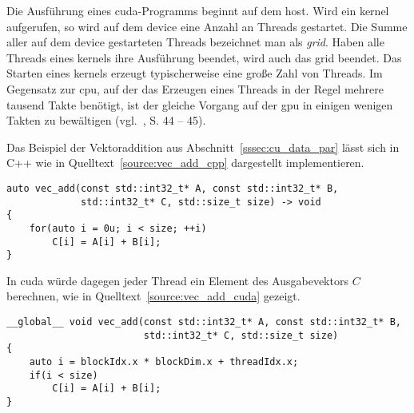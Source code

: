 Die Ausführung eines \gls{cuda}-Programms beginnt auf dem \gls{host}. Wird ein \gls{kernel} aufgerufen, so wird auf dem
\gls{device} eine Anzahl an Threads gestartet. Die Summe aller auf dem \gls{device} gestarteten Threads bezeichnet
man als \textit{\gls{grid}}. Haben alle Threads eines \gls{kernel}s ihre Ausführung beendet, wird auch das \gls{grid}
beendet.
Das Starten eines \gls{kernel}s erzeugt typischerweise eine große Zahl von Threads. Im Gegensatz zur \gls{cpu}, auf der
das Erzeugen eines Threads in der Regel mehrere tausend Takte benötigt, ist der gleiche Vorgang auf der \gls{gpu} in
einigen wenigen Takten zu bewältigen (vgl.~\cite{kirkhwu}, S. 44 -- 45).

Das Beispiel der Vektoraddition aus Abschnitt~\ref{sssec:cu_data_par} lässt sich in C++ wie in
Quelltext~\ref{source:vec_add_cpp} dargestellt implementieren. 

\begin{code}
\begin{verbatim}
auto vec_add(const std::int32_t* A, const std::int32_t* B,
             std::int32_t* C, std::size_t size) -> void
{
    for(auto i = 0u; i < size; ++i)
        C[i] = A[i] + B[i];
}
\end{verbatim}
\label{source:vec_add_cpp}
\end{code}

In \gls{cuda} würde dagegen jeder Thread ein Element des Ausgabevektors $C$ berechnen, wie in
Quelltext~\ref{source:vec_add_cuda} gezeigt.

\begin{code}
\begin{verbatim}
__global__ void vec_add(const std::int32_t* A, const std::int32_t* B,
                        std::int32_t* C, std::size_t size)
{
    auto i = blockIdx.x * blockDim.x + threadIdx.x;
    if(i < size)
        C[i] = A[i] + B[i];
}
\end{verbatim}
\label{source:vec_add_cuda}
\end{code}

